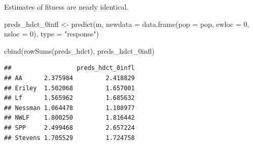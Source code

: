 \documentclass[
  ignorenonframetext,
]{beamer}
\newenvironment{Shaded}{\begin{snugshade}}{\end{snugshade}}
\newcommand{\AttributeTok}[1]{\textcolor[rgb]{0.77,0.63,0.00}{#1}}
\newcommand{\DecValTok}[1]{\textcolor[rgb]{0.00,0.00,0.81}{#1}}
\newcommand{\FunctionTok}[1]{\textcolor[rgb]{0.00,0.00,0.00}{#1}}
\newcommand{\NormalTok}[1]{#1}
\newcommand{\OtherTok}[1]{\textcolor[rgb]{0.56,0.35,0.01}{#1}}
\newcommand{\StringTok}[1]{\textcolor[rgb]{0.31,0.60,0.02}{#1}}
\begin{document}
\begin{frame}[fragile]{}
\protect\hypertarget{section-43}{}
Estimates of fitness are nearly identical.

\vspace{12pt}
\tiny

\begin{Shaded}
\begin{Highlighting}[]
\NormalTok{preds\_hdct\_0infl }\OtherTok{\textless{}{-}} \FunctionTok{predict}\NormalTok{(m, }
  \AttributeTok{newdata =} \FunctionTok{data.frame}\NormalTok{(}\AttributeTok{pop =}\NormalTok{ pop, }\AttributeTok{ewloc =} \DecValTok{0}\NormalTok{, }\AttributeTok{nsloc =} \DecValTok{0}\NormalTok{), }
  \AttributeTok{type =} \StringTok{"response"}\NormalTok{)}

\FunctionTok{cbind}\NormalTok{(}\FunctionTok{rowSums}\NormalTok{(preds\_hdct), preds\_hdct\_0infl)}
\end{Highlighting}
\end{Shaded}

\begin{verbatim}
##                  preds_hdct_0infl
## AA      2.375984         2.418829
## Eriley  1.502068         1.657001
## Lf      1.565962         1.685632
## Nessman 1.064478         1.108977
## NWLF    1.800250         1.816442
## SPP     2.499468         2.657224
## Stevens 1.705529         1.724758
\end{verbatim}
\end{frame}
\end{document}
